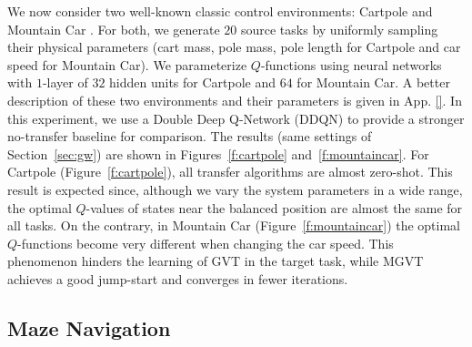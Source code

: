 \documentclass{article}
\begin{document}
We now consider two well-known classic control environments: Cartpole and Mountain Car \citep{sutton1998reinforcement}. For both, we generate $20$ source tasks by uniformly sampling their physical parameters (cart mass, pole mass, pole length for Cartpole and car speed for Mountain Car). We parameterize $Q$-functions using neural networks with $1$-layer of $32$ hidden units for Cartpole and $64$ for Mountain Car. A better description of these two environments and their parameters is given in App. \ref{}. In this experiment, we use a Double Deep Q-Network (DDQN) \cite{van2016deep} to provide a stronger no-transfer baseline for comparison. The results (same settings of Section~\ref{sec:gw}) are shown in Figures~\ref{f:cartpole} and~\ref{f:mountaincar}. For Cartpole (Figure~\ref{f:cartpole}), all transfer algorithms are almost zero-shot. This result is expected since, although we vary the system parameters in a wide range, the optimal $Q$-values of states near the balanced position are almost the same for all tasks. On the contrary, in Mountain Car (Figure~\ref{f:mountaincar}) the optimal $Q$-functions become very different when changing the car speed. This phenomenon hinders the learning of GVT in the target task, while MGVT achieves a good jump-start and converges in fewer iterations.

\subsection{Maze Navigation} \label{sec:mn}

\end{document}
